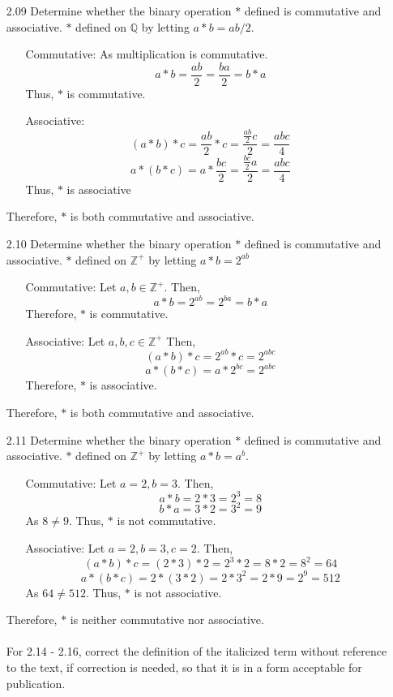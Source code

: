 \documentclass[12pt]{article}
\newcommand{\Z}{\mathds{Z}}
\newcommand{\Q}{\mathbb{Q}}
\begin{document}
	\begin{enumerate}
		\item[2.09] Determine whether the binary operation $*$ defined is commutative and associative. $*$ defined on $\Q$ by letting $a*b = ab/2$.
		\begin{enumerate}
			\item [Commutative:] As multiplication is commutative.
			\[a*b=\frac{ab}{2}=\frac{ba}{2}=b*a\]
			Thus, $*$ is commutative.
			\item[Associative:]
			\[(a*b)*c=\frac{ab}{2}*c=\frac{\frac{ab}{2}c}{2}=\frac{abc}{4}\]
			\[a*(b*c)=a*\frac{bc}{2}=\frac{\frac{bc}{2}a}{2}=\frac{abc}{4}\]
			Thus, $*$ is associative
		\end{enumerate}
		Therefore, $*$ is both commutative and associative.
		\item[2.10] Determine whether the binary operation $*$ defined is commutative and associative. $*$ defined on $\Z^+$ by letting $a*b = 2^{ab}$ 
		
		\begin{enumerate}
			\item [Commutative:]
			Let $a,b \in \Z^+$. Then,
			\[a*b=2^{ab}=2^{ba}=b*a\]
			Therefore, $*$ is commutative.
			\item[Associative:]
			Let $a,b,c \in \Z^+$ Then,
			\[(a*b)*c = 2^{ab}*c = 2^{abc}\]
			\[a*(b*c)= a*2^{bc}=2^{abc}\]
			Therefore, $*$ is associative.
		\end{enumerate}
		Therefore, $*$ is both commutative and associative.
		\item[2.11] Determine whether the binary operation $*$ defined is commutative and associative. $*$ defined on $\Z^+$ by letting $a * b = a^b$.
		\begin{enumerate}
			\item [Commutative:]
				Let $a=2,b=3$. Then, 
				\[a*b=2*3=2^3=8\]
				\[b*a=3*2=3^2=9\]
				As $8\not = 9$. Thus, $*$ is not commutative.
			\item[Associative:]
				Let $a=2,b=3, c=2$. Then,
				\[(a*b)*c=(2*3)*2=2^3*2=8*2=8^2=64\]
				\[a*(b*c)=2*(3*2)=2*3^2=2*9=2^9=512\]
				As $64 \not = 512$. Thus, $*$ is not associative.
		\end{enumerate}
		Therefore, $*$ is neither commutative nor associative.\\
		\\
		For 2.14 - 2.16, correct the definition of the italicized term without reference to the text, if correction is needed, so that it is in a form acceptable for publication.
		\begin{enumerate}
			

\end{enumerate}
\end{enumerate}
\end{document}
